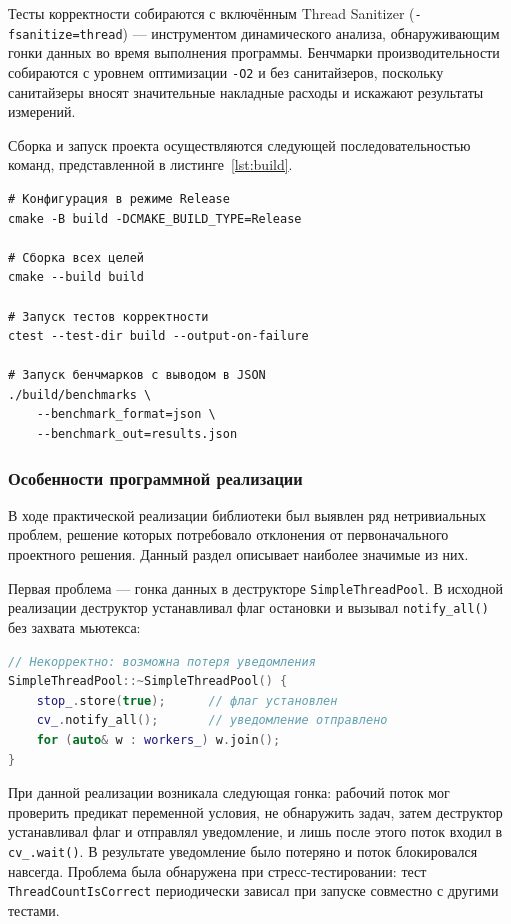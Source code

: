 Тесты корректности собираются с включённым Thread Sanitizer
(\texttt{-fsanitize=thread}) --- инструментом динамического
анализа, обнаруживающим гонки данных во время выполнения
программы. Бенчмарки производительности собираются с уровнем
оптимизации \texttt{-O2} и без санитайзеров, поскольку
санитайзеры вносят значительные накладные расходы и искажают
результаты измерений.

Сборка и запуск проекта осуществляются следующей
последовательностью команд, представленной
в листинге~\ref{lst:build}.

\begin{lstlisting}[caption={Сборка и запуск проекта},
                   label={lst:build}]
# Конфигурация в режиме Release
cmake -B build -DCMAKE_BUILD_TYPE=Release

# Сборка всех целей
cmake --build build

# Запуск тестов корректности
ctest --test-dir build --output-on-failure

# Запуск бенчмарков с выводом в JSON
./build/benchmarks \
    --benchmark_format=json \
    --benchmark_out=results.json
\end{lstlisting}

\subsubsection{Особенности программной реализации}

В ходе практической реализации библиотеки был выявлен ряд
нетривиальных проблем, решение которых потребовало отклонения
от первоначального проектного решения. Данный раздел описывает
наиболее значимые из них.

Первая проблема --- гонка данных в деструкторе
\texttt{SimpleThreadPool}. В исходной реализации деструктор
устанавливал флаг остановки и вызывал \texttt{notify\_all()}
без захвата мьютекса:

\begin{lstlisting}[language=C++,
                   caption={Исходная некорректная реализация
                            деструктора},
                   label={lst:destructor-bug}]
// Некорректно: возможна потеря уведомления
SimpleThreadPool::~SimpleThreadPool() {
    stop_.store(true);      // флаг установлен
    cv_.notify_all();       // уведомление отправлено
    for (auto& w : workers_) w.join();
}
\end{lstlisting}

При данной реализации возникала следующая гонка: рабочий поток
мог проверить предикат переменной условия, не обнаружить задач,
затем деструктор устанавливал флаг и отправлял уведомление,
и лишь после этого поток входил в \texttt{cv\_.wait()}.
В результате уведомление было потеряно и поток блокировался
навсегда. Проблема была обнаружена при стресс-тестировании:
тест \texttt{ThreadCountIsCorrect} периодически зависал при
запуске совместно с другими тестами.

